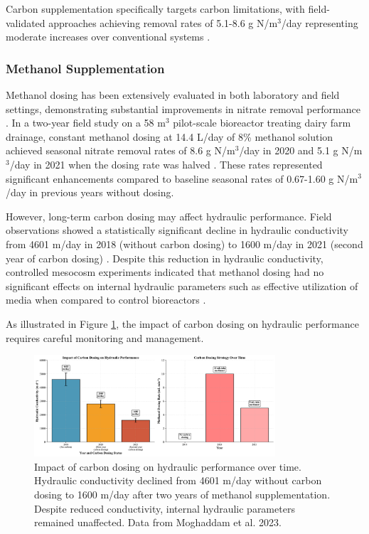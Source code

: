 \documentclass[12pt,a4paper]{article}
\begin{document}
Carbon supplementation specifically targets carbon limitations, with field-validated approaches achieving removal rates of 5.1-8.6 g N/m$^3$/day representing moderate increases over conventional systems \citep{RN632}.

\subsubsection{Methanol Supplementation}

Methanol dosing has been extensively evaluated in both laboratory and field settings, demonstrating substantial improvements in nitrate removal performance \citep{RN632}. In a two-year field study on a 58 m$^3$ pilot-scale bioreactor treating dairy farm drainage, constant methanol dosing at 14.4 L/day of 8\% methanol solution achieved seasonal nitrate removal rates of 8.6 g N/m$^3$/day in 2020 and 5.1 g N/m$^3$/day in 2021 when the dosing rate was halved \citep{RN632}. These rates represented significant enhancements compared to baseline seasonal rates of 0.67-1.60 g N/m$^3$/day in previous years without dosing.

However, long-term carbon dosing may affect hydraulic performance. Field observations showed a statistically significant decline in hydraulic conductivity from 4601 m/day in 2018 (without carbon dosing) to 1600 m/day in 2021 (second year of carbon dosing) \citep{RN632}. Despite this reduction in hydraulic conductivity, controlled mesocosm experiments indicated that methanol dosing had no significant effects on internal hydraulic parameters such as effective utilization of media when compared to control bioreactors \citep{RN632}.

As illustrated in Figure \ref{fig:hydraulic_performance}, the impact of carbon dosing on hydraulic performance requires careful monitoring and management.

\begin{figure}[H]
\centering
\includegraphics[width=0.8\textwidth]{fig3_hydraulic_performance_scientific}
\caption{Impact of carbon dosing on hydraulic performance over time. Hydraulic conductivity declined from 4601 m/day without carbon dosing to 1600 m/day after two years of methanol supplementation. Despite reduced conductivity, internal hydraulic parameters remained unaffected. Data from Moghaddam et al. 2023.}
\label{fig:hydraulic_performance}
\end{figure}
\end{document}
